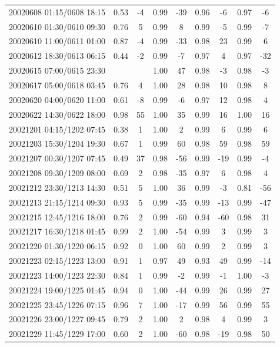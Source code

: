 \documentclass[linenumbers,draft]{agujournal}
\begin{document}
\begin{center}
\begin{longtable}{c||cc|cc|cc|cc}
20020608 01:15/0608 18:15 & 0.53 & -4 & 0.99 & -39 & 0.96 & -6 & 0.97 & -6 \\
20020610 01:30/0610 09:30 & 0.76 & 5 & 0.99 & 8 & 0.99 & -5 & 0.99 & -7 \\
20020610 11:00/0611 01:00 & 0.87 & -4 & 0.99 & -33 & 0.98 & 23 & 0.99 & 6 \\
20020612 18:30/0613 06:15 & 0.44 & -2 & 0.99 & -7 & 0.97 & 4 & 0.97 & -32 \\
20020615 07:00/0615 23:30 & & & 1.00 & 47 & 0.98 & -3 & 0.98 & -3 \\
20020617 05:00/0618 03:45 & 0.76 & 4 & 1.00 & 28 & 0.98 & 10 & 0.98 & 8 \\
20020620 04:00/0620 11:00 & 0.61 & -8 & 0.99 & -6 & 0.97 & 12 & 0.98 & 4 \\
20020622 14:30/0622 18:00 & 0.98 & 55 & 1.00 & 35 & 0.99 & 16 & 1.00 & 16 \\
20021201 04:15/1202 07:45 & 0.38 & 1 & 1.00 & 2 & 0.99 & 6 & 0.99 & 6 \\
20021203 15:30/1204 19:30 & 0.67 & 1 & 0.99 & 60 & 0.98 & 59 & 0.98 & 59 \\
20021207 00:30/1207 07:45 & 0.49 & 37 & 0.98 & -56 & 0.99 & -19 & 0.99 & -4 \\
20021208 09:30/1209 08:00 & 0.69 & 2 & 0.98 & -35 & 0.97 & 6 & 0.98 & 4 \\
20021212 23:30/1213 14:30 & 0.51 & 5 & 1.00 & 36 & 0.99 & -3 & 0.81 & -56 \\
20021213 21:15/1214 09:30 & 0.93 & 5 & 0.99 & -35 & 0.99 & -13 & 0.99 & -47 \\
20021215 12:45/1216 18:00 & 0.76 & 2 & 0.99 & -60 & 0.94 & -60 & 0.98 & 31 \\
20021217 16:30/1218 01:45 & 0.99 & 2 & 1.00 & -54 & 0.99 & 3 & 0.99 & 3 \\
20021220 01:30/1220 06:15 & 0.92 & 0 & 1.00 & 60 & 0.99 & 2 & 0.99 & 3 \\
20021223 02:15/1223 13:00 & 0.91 & 1 & 0.97 & 49 & 0.93 & 49 & 0.99 & -14 \\
20021223 14:00/1223 22:30 & 0.84 & 1 & 0.99 & -2 & 0.99 & -1 & 1.00 & -3 \\
20021224 19:00/1225 01:45 & 0.94 & 0 & 1.00 & -44 & 0.99 & 26 & 0.99 & 27 \\
20021225 23:45/1226 07:15 & 0.96 & 7 & 1.00 & -17 & 0.99 & 56 & 0.99 & 55 \\
20021226 23:00/1227 09:45 & 0.79 & 2 & 1.00 & 2 & 0.98 & 4 & 0.99 & 3 \\
20021229 11:45/1229 17:00 & 0.60 & 2 & 1.00 & -60 & 0.98 & -19 & 0.98 & 50 \\

\end{longtable}
\end{center}
\end{document}
